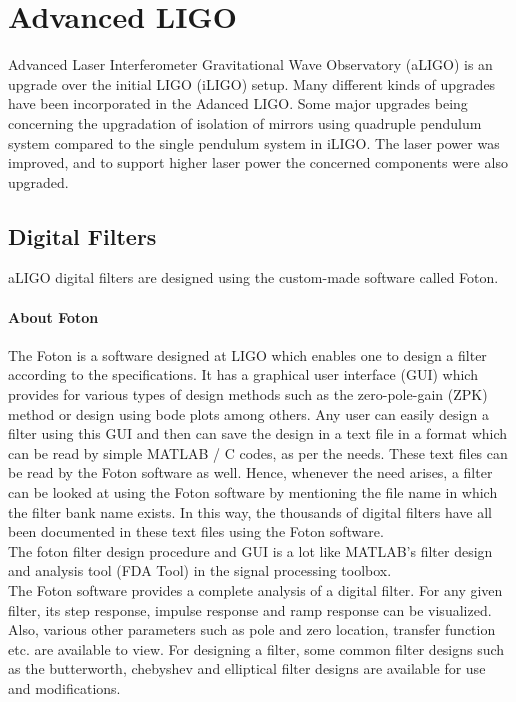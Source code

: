 \documentclass[colorlinks=true,pdfstartview=FitV,linkcolor=blue,
            citecolor=red,urlcolor=magenta]{ligodoc}
\begin{document}
\section{Advanced LIGO}
Advanced Laser Interferometer Gravitational Wave Observatory (aLIGO) is an upgrade over the initial LIGO (iLIGO)\cite{LIGO} setup. Many different kinds of upgrades have been incorporated in the Adanced LIGO. Some major upgrades being concerning the upgradation of isolation of mirrors using quadruple pendulum system compared to the single pendulum system in iLIGO. The laser power was improved, and to support higher laser power the concerned components were also upgraded. 
	\subsection{Digital Filters}
	aLIGO digital filters are designed using the custom-made software called Foton.
	    \paragraph{About Foton}The Foton is a software designed at LIGO which enables one to design a filter according to the specifications. It has a graphical user interface (GUI) which provides for various types of design methods such as the zero-pole-gain (ZPK) method or design using bode plots among others. Any user can easily design a filter using this GUI and then can save the design in a text file in a format which can be read by simple MATLAB / C codes, as per the needs. These text files can be read by the Foton software as well. Hence, whenever the need arises, a filter can be looked at using the Foton software by mentioning the file name in which the filter bank name exists. In this way, the thousands of digital filters have all been documented in these text files using the Foton software. \\The foton filter design procedure and GUI is a lot like MATLAB's filter design and analysis tool (FDA Tool) in the signal processing toolbox. \\
	The Foton software provides a complete analysis of a digital filter. For any given filter, its step response, impulse response and ramp response can be visualized. Also, various other parameters such as pole and zero location, transfer function etc. are available to view. For designing a filter, some common filter designs such as the butterworth, chebyshev and elliptical filter designs are available for use and modifications. \\
\end{document}
